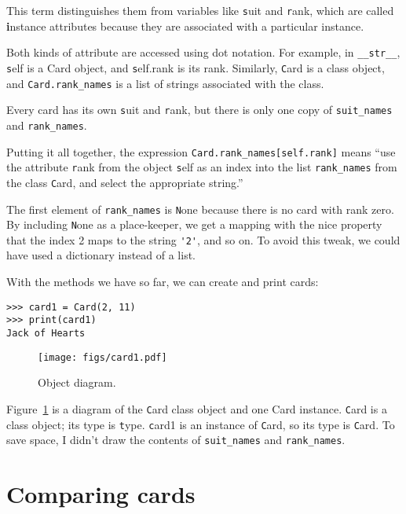 \documentclass[
DIV=11,
fontsize=13,
twoside,
headinclude=false,
titlepage=firstiscover,
abstract=true,
headsepline=true,
footsepline=true,
chapterprefix=true, %
headings=big,
bibliography=totoc,%
captions=tableheading
]{scrbook}
\theoremstyle{definition}
\begin{document}
This term distinguishes them from variables like {\texttt suit} and {\texttt
  rank}, which are called {\textbf instance attributes} because they are
associated with a particular instance.

Both kinds of attribute are accessed using dot notation.  For
example, in \verb"__str__", {\texttt self} is a Card object,
and {\texttt self.rank} is its rank.  Similarly, {\texttt Card}
is a class object, and \verb"Card.rank_names" is a
list of strings associated with the class.

Every card has its own {\texttt suit} and {\texttt rank}, but there
is only one copy of \verb"suit_names" and \verb"rank_names".

Putting it all together, the expression
\verb"Card.rank_names[self.rank]" means ``use the attribute {\texttt rank}
from the object {\texttt self} as an index into the list \verb"rank_names"
from the class {\texttt Card}, and select the appropriate string.''

The first element of \verb"rank_names" is {\texttt None} because there
is no card with rank zero.  By including {\texttt None} as a place-keeper,
we get a mapping with the nice property that the index 2 maps to the
string \verb"'2'", and so on.  To avoid this tweak, we could have
used a dictionary instead of a list.

With the methods we have so far, we can create and print cards:

\begin{lstlisting}
>>> card1 = Card(2, 11)
>>> print(card1)
Jack of Hearts
\end{lstlisting}

\begin{figure}
\centerline
{\texttt{[image: figs/card1.pdf]}}
\caption{Object diagram.}
\label{fig.card1}
\end{figure}

Figure~\ref{fig.card1} is a diagram of the {\texttt Card} class object and
one Card instance.  {\texttt Card} is a class object; its type is {\texttt
  type}.  {\texttt card1} is an instance of {\texttt Card}, so its type is
{\texttt Card}.  To save space, I didn't draw the contents of
\verb"suit_names" and \verb"rank_names".  
  


\section{Comparing cards}
\label{comparecard}
\end{document}
